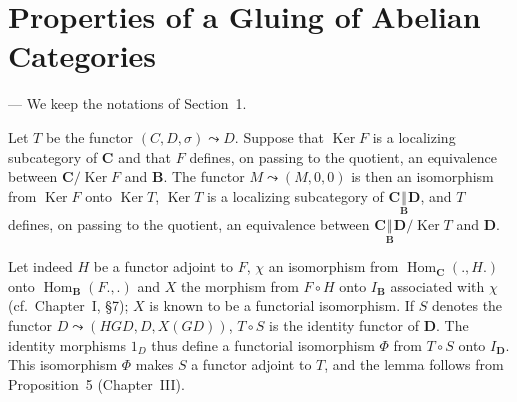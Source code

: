 %
%
%
\providecommand{\gluecat}[3]{#1 \underset{#2}{\Vert} #3}
\providecommand{\glueelt}[2]{#1 \Vert #2}

\section{Properties of a Gluing of Abelian Categories}

--- We keep the notations of Section~1.

\begin{lemma}
Let $T$ be the functor $(C, D, \sigma) \leadsto D$. Suppose that
$\operatorname{Ker} F$ is a localizing subcategory of $\mathbf{C}$ and
that $F$ defines, on passing to the quotient, an equivalence between
$\mathbf{C}/\operatorname{Ker} F$ and $\mathbf{B}$. The functor
$M \leadsto (M, 0, 0)$ is then an isomorphism from
$\operatorname{Ker} F$ onto $\operatorname{Ker} T$,
$\operatorname{Ker} T$ is a localizing subcategory of
$\gluecat{\mathbf{C}}{\mathbf{B}}{\mathbf{D}}$, and $T$ defines, on
passing to the quotient, an equivalence between
$\gluecat{\mathbf{C}}{\mathbf{B}}{\mathbf{D}}/\operatorname{Ker} T$ and
$\mathbf{D}$.
\end{lemma}

Let indeed $H$ be a functor adjoint to $F$, $\chi$ an isomorphism from
$\operatorname{Hom}_{\mathbf{C}}(., H.)$ onto
$\operatorname{Hom}_{\mathbf{B}}(F., .)$ and $X$ the morphism from
$F \circ H$ onto $I_{\mathbf{B}}$ associated with $\chi$ (cf.\
Chapter~I, \S7); $X$ is known to be a functorial isomorphism. If $S$
denotes the functor $D \leadsto (HGD, D, X(GD))$, $T \circ S$ is the
identity functor of $\mathbf{D}$. The identity morphisms $1_D$ thus
define a functorial isomorphism $\Phi$ from $T \circ S$ onto
$I_{\mathbf{D}}$. This isomorphism $\Phi$ makes $S$ a functor adjoint to
$T$, and the lemma follows from Proposition~5 (Chapter~III).


